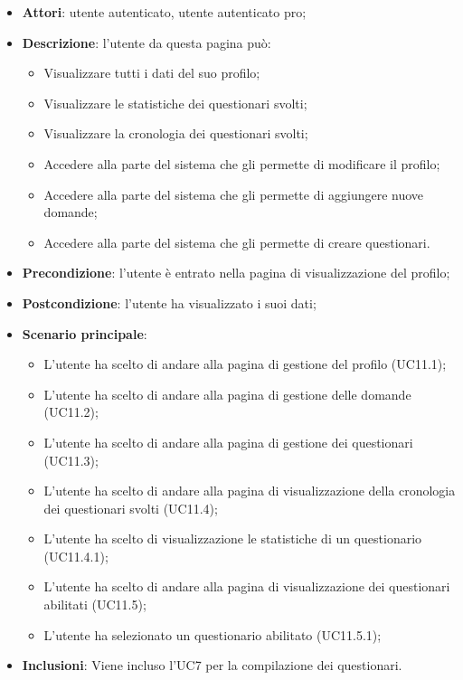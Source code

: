 \begin{itemize}
\item\textbf{Attori}: utente autenticato, utente autenticato pro;
\item\textbf{Descrizione}: l'utente da questa pagina può: 
\begin{itemize}
	\item Visualizzare tutti i dati del suo profilo;
	\item Visualizzare le statistiche dei questionari svolti;
	\item Visualizzare la cronologia dei questionari svolti;
	\item Accedere alla parte del sistema che gli permette di modificare il profilo;
	\item Accedere alla parte del sistema che gli permette di aggiungere nuove domande;
	\item Accedere alla parte del sistema che gli permette di creare questionari.
\end{itemize}
\item\textbf{Precondizione}: l'utente è entrato nella pagina di visualizzazione del profilo;
\item\textbf{Postcondizione}: l'utente ha visualizzato i suoi dati;
\item\textbf{Scenario principale}:
\begin{itemize}
\item L'utente ha scelto di andare alla pagina di gestione del profilo (UC11.1);
\item L'utente ha scelto di andare alla pagina di gestione delle domande (UC11.2);  
\item L'utente ha scelto di andare alla pagina di gestione dei questionari (UC11.3);
\item L'utente ha scelto di andare alla pagina di visualizzazione della cronologia dei questionari svolti (UC11.4);
\item L'utente ha scelto di visualizzazione le statistiche di un questionario (UC11.4.1);
\item L'utente ha scelto di andare alla pagina di visualizzazione dei questionari abilitati (UC11.5);
\item L'utente ha selezionato un questionario abilitato (UC11.5.1);
\end{itemize}
\item\textbf{Inclusioni}: Viene incluso l'UC7 per la compilazione dei questionari.
\end{itemize}

